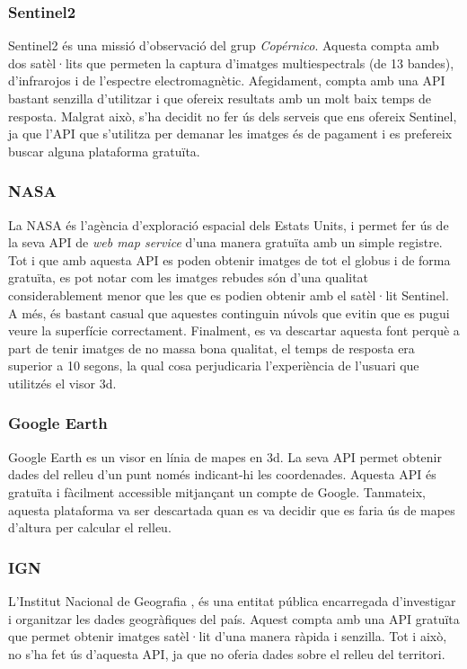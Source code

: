 ﻿\documentclass[10pt,a4paper,twocolumn,twoside]{article}
\begin{document}
\subsubsection{Sentinel2}
Sentinel2 \cite{Sentinel} és una missió d'observació del grup \textit{Copérnico}. Aquesta compta amb dos satèl·lits que permeten la captura d'imatges multiespectrals (de 13 bandes), d'infrarojos i de l'espectre electromagnètic. Afegidament, compta amb una API bastant senzilla d'utilitzar i que ofereix resultats amb un molt baix temps de resposta. Malgrat això, s'ha decidit no fer ús dels serveis que ens ofereix Sentinel, ja que l'API que s'utilitza per demanar les imatges és de pagament i es prefereix buscar alguna plataforma gratuïta.

\subsubsection{NASA}
La NASA \cite{NASA} és l'agència d'exploració espacial dels Estats Units, i permet fer ús de la seva API de \textit{web map service} d'una manera gratuïta amb un simple registre. Tot i que amb aquesta API es poden obtenir imatges de tot el globus i de forma gratuïta, es pot notar com les imatges rebudes són d'una qualitat considerablement menor que les que es podien obtenir amb el satèl·lit Sentinel. A més, és bastant casual que aquestes continguin núvols que evitin que es pugui veure la superfície correctament. Finalment, es va descartar aquesta font perquè a part de tenir imatges de no massa bona qualitat, el temps de resposta era superior a 10 segons, la qual cosa perjudicaria l'experiència de l'usuari que utilitzés el visor 3d.

\subsubsection{Google Earth}
Google Earth \cite{Earth} es un visor en línia de mapes en 3d. La seva API permet obtenir dades del relleu d'un punt només indicant-hi les coordenades. Aquesta API és gratuïta i fàcilment accessible mitjançant un compte de Google. Tanmateix, aquesta plataforma va ser descartada quan es va decidir que es faria ús de mapes d'altura per calcular el relleu.

\subsubsection{IGN}
L'Institut Nacional de Geografia \cite{ign}, és una entitat pública encarregada d'investigar i organitzar les dades geogràfiques del país. Aquest compta amb una API gratuïta que permet obtenir imatges satèl·lit d'una manera ràpida i senzilla.
Tot i això, no s'ha fet ús d'aquesta API, ja que no oferia dades sobre el relleu del territori.
\end{document}
